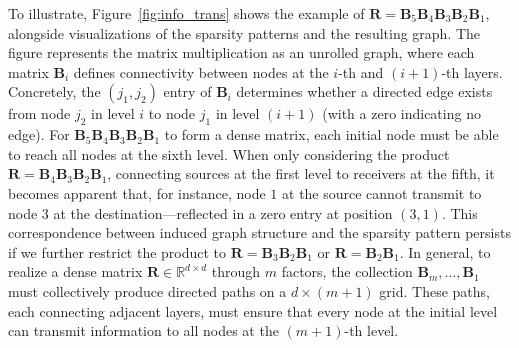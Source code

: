 To illustrate, Figure~\ref{fig:info_trans} shows the example of $\bm{R}=\bm{B}_5\bm{B}_4\bm{B}_3\bm{B}_2\bm{B}_1$, alongside visualizations of the sparsity patterns and the resulting graph. The figure represents the matrix multiplication as an unrolled graph, where each matrix $\bm{B}_i$ defines connectivity between nodes at the $i$-th and $(i+1)$-th layers. Concretely, the $(j_1,j_2)$ entry of $\bm{B}_i$ determines whether a directed edge exists from node $j_2$ in level $i$ to node $j_1$ in level $(i+1)$ (with a zero indicating no edge). For $\bm{B}_5\bm{B}_4\bm{B}_3\bm{B}_2\bm{B}_1$ to form a dense matrix, each initial node must be able to reach all nodes at the sixth level. When only considering the product $\bm{R}=\bm{B}_4\bm{B}_3\bm{B}_2\bm{B}_1$, connecting sources at the first level to receivers at the fifth, it becomes apparent that, for instance, node $1$ at the source cannot transmit to node $3$ at the destination—reflected in a zero entry at position $(3,1)$. This correspondence between induced graph structure and the sparsity pattern persists if we further restrict the product to $\bm{R}=\bm{B}_3\bm{B}_2\bm{B}_1$ or $\bm{R}=\bm{B}_2\bm{B}_1$. In general, to realize a dense matrix $\bm{R}\in\mathbb{R}^{d\times d}$ through $m$ factors, the collection $\bm{B}_m,\ldots,\bm{B}_1$ must collectively produce directed paths on a $d\times (m+1)$ grid. These paths, each connecting adjacent layers, must ensure that every node at the initial level can transmit information to all nodes at the $(m+1)$-th level.

